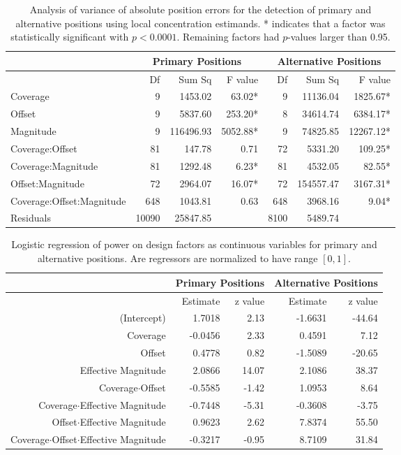 \begin{table}[t!]
\centering{}%
\begin{tabular}{l|rrr|rrr}
\hline 
 & \multicolumn{3}{c|}{Primary Positions} & \multicolumn{3}{c}{Alternative Positions}\tabularnewline
\hline 
 & Df  & Sum Sq  & F value  & Df  & Sum Sq  & F value \tabularnewline
\hline 
Coverage & 9  & 1453.02  & 63.02{*} & 9  & 11136.04  & 1825.67{*} \tabularnewline
Offset  & 9  & 5837.60  & 253.20{*}  & 8  & 34614.74  & 6384.17{*} \tabularnewline
Magnitude  & 9  & 116496.93  & 5052.88{*}  & 9  & 74825.85  & 12267.12{*} \tabularnewline
Coverage:Offset  & 81  & 147.78  & 0.71\phantom{*}  & 72  & 5331.20  & 109.25{*} \tabularnewline
Coverage:Magnitude  & 81  & 1292.48  & 6.23{*}  & 81  & 4532.05  & 82.55{*} \tabularnewline
Offset:Magnitude  & 72  & 2964.07  & 16.07{*} & 72  & 154557.47  & 3167.31{*} \tabularnewline
Coverage:Offset:Magnitude  & 648  & 1043.81  & 0.63\phantom{*}  & 648  & 3968.16  & 9.04{*} \tabularnewline
Residuals  & 10090  & 25847.85  &  & 8100  & 5489.74  & \tabularnewline
\hline 
\end{tabular}\caption{Analysis of variance of absolute position errors for the detection
of primary and alternative positions using local concentration estimands.
{*} indicates that a factor was statistically significant with $p<0.0001$.
Remaining factors had $p$-values larger than 0.95.
\label{tab:detectionAnova}}
\end{table}
%
\begin{table}[t!]
\centering{}%
\begin{tabular}{r|rr|rr}
\hline 
 & \multicolumn{2}{c|}{Primary Positions} & \multicolumn{2}{c}{Alternative Positions}\tabularnewline
\hline 
 & Estimate  & z value  & Estimate  & z value \tabularnewline
\hline 
(Intercept)  & 1.7018  & 2.13  & -1.6631  & -44.64 \tabularnewline
Coverage & -0.0456  & 2.33  & 0.4591  & 7.12 \tabularnewline
Offset  & 0.4778  & 0.82  & -1.5089  & -20.65 \tabularnewline
Effective Magnitude  & 2.0866  & 14.07  & 2.1086  & 38.37 \tabularnewline
Coverage$\cdot$Offset  & -0.5585  & -1.42  & 1.0953  & 8.64 \tabularnewline
Coverage$\cdot$Effective Magnitude  & -0.7448  & -5.31  & -0.3608  & -3.75 \tabularnewline
Offset$\cdot$Effective Magnitude  & 0.9623  & 2.62  & 7.8374  & 55.50 \tabularnewline
Coverage$\cdot$Offset$\cdot$Effective Magnitude  & -0.3217  & -0.95  & 8.7109  & 31.84 \tabularnewline
\hline 
\end{tabular}\caption{Logistic regression of power on design factors as continuous variables
for primary and alternative positions. Are regressors are normalized
to have range $[0,1]$.
\label{tab:detectionGlm}}
\end{table}
\fi

